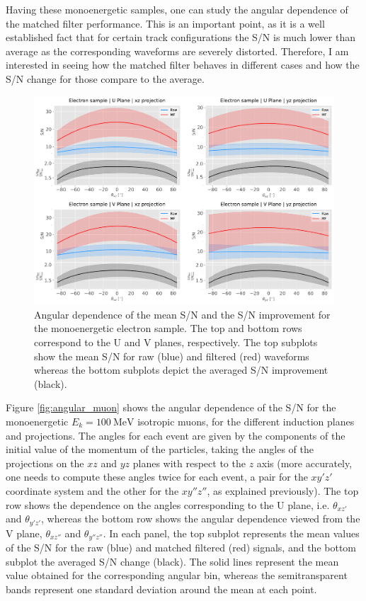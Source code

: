 Having these monoenergetic samples, one can study the angular dependence of the matched filter performance. This is an important point, as it is a well established fact that for certain track configurations the S/N is much lower than average as the corresponding waveforms are severely distorted. Therefore, I am interested in seeing how the matched filter behaves in different cases and how the S/N change for those compare to the average.

\begin{figure}[t]
	\centering
	\includegraphics[width=0.9\linewidth]{Images/Matched_Filter/larsoft_electron_angular.pdf}
	\caption[Angular dependence of the mean S/N and the S/N improvement for the monoenergetic electron sample.]{Angular dependence of the mean S/N and the S/N improvement for the monoenergetic electron sample. The top and bottom rows correspond to the U and V planes, respectively. The top subplots show the mean S/N for raw (blue) and filtered (red) waveforms whereas the bottom subplots depict the averaged S/N improvement (black).}
	\label{fig:angular_electron}
\end{figure}

Figure \ref{fig:angular_muon} shows the angular dependence of the S/N for the monoenergetic $E_{k}=100 \ \mathrm{MeV}$ isotropic muons, for the different induction planes and projections. The angles for each event are given by the components of the initial value of the momentum of the particles, taking the angles of the projections on the $xz$ and $yz$ planes with respect to the $z$ axis (more accurately, one needs to compute these angles twice for each event, a pair for the $xy'z'$ coordinate system and the other for the $xy''z''$, as explained previously). The top row shows the dependence on the angles corresponding to the U plane, i.e. $\theta_{xz'}$ and $\theta_{y'z'}$, whereas the bottom row shows the angular dependence viewed from the V plane, $\theta_{xz''}$ and $\theta_{y''z''}$. In each panel, the top subplot represents the mean values of the S/N for the raw (blue) and matched filtered (red) signals, and the bottom subplot the averaged S/N change (black). The solid lines represent the mean value obtained for the corresponding angular bin, whereas the semitransparent bands represent one standard deviation around the mean at each point.

